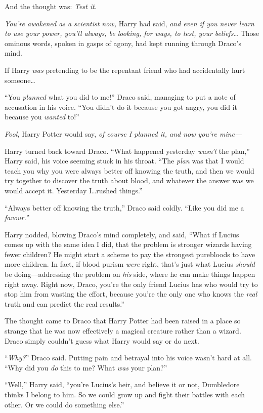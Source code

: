 And the thought was: \emph{Test it.}

\emph{You’re awakened as a scientist now,} Harry had said, \emph{and even if you never learn to use your power, you’ll always, be looking, for ways, to test, your beliefs…} Those ominous words, spoken in gasps of agony, had kept running through Draco’s mind.

If Harry \emph{was} pretending to be the repentant friend who had accidentally hurt someone…

“You \emph{planned} what you did to me!” Draco said, managing to put a note of accusation in his voice. “You didn’t do it because you got angry, you did it because you \emph{wanted} to!”

\emph{Fool,} Harry Potter would say, \emph{of course I planned it, and now you’re mine—}

Harry turned back toward Draco. “What happened yesterday \emph{wasn’t} the plan,” Harry said, his voice seeming stuck in his throat. “The \emph{plan} was that I would teach you why you were always better off knowing the truth, and then we would try together to discover the truth about blood, and whatever the answer was we would accept it. Yesterday I…rushed things.”

“Always better off knowing the truth,” Draco said coldly. “Like you did me a \emph{favour.}”

Harry nodded, blowing Draco’s mind completely, and said, “What if Lucius comes up with the same idea I did, that the problem is stronger wizards having fewer children? He might start a scheme to pay the strongest purebloods to have more children. In fact, if blood purism \emph{were} right, that’s just what Lucius \emph{should} be doing—addressing the problem on \emph{his} side, where he can make things happen right away. Right now, Draco, you’re the only friend Lucius has who would try to stop him from wasting the effort, because you’re the only one who knows the \emph{real} truth and can predict the real results.”

The thought came to Draco that Harry Potter had been raised in a place so strange that he was now effectively a magical creature rather than a wizard. Draco simply couldn’t guess what Harry would say or do next.

“\emph{Why?}” Draco said. Putting pain and betrayal into his voice wasn’t hard at all. “Why did you \emph{do} this to me? What \emph{was} your plan?”

“Well,” Harry said, “you’re Lucius’s heir, and believe it or not, Dumbledore thinks I belong to him. So we could grow up and fight their battles with each other. Or we could do something else.”

